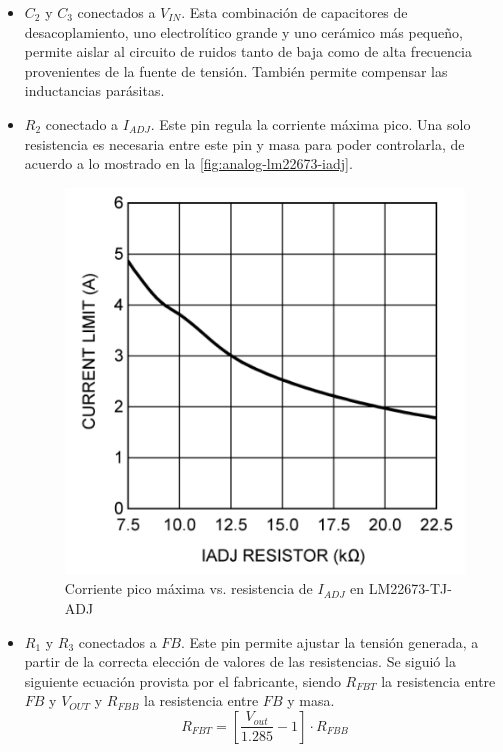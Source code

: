 \documentclass[titlepage, 12pt]{article}
\begin{document}
  \begin{itemize}

    \item $C_2$ y $C_3$ conectados a $V_{IN}$. Esta combinación de capacitores de desacoplamiento, uno electrolítico grande y uno cerámico más pequeño, permite aislar al circuito de ruidos tanto de baja como de alta frecuencia provenientes de la fuente de tensión. También permite compensar las inductancias parásitas.

    \item $R_2$ conectado a $I_{ADJ}$. Este pin regula la corriente máxima pico. Una solo resistencia es necesaria entre este pin y masa para poder controlarla, de acuerdo a lo mostrado en la \autoref{fig:analog-lm22673-iadj}.

      \begin{figure}[!htbp]
        \centering
        \includegraphics[scale=0.6]{images/analog-lm22673-iadj.png}
        \caption{Corriente pico máxima vs. resistencia de $I_{ADJ}$ en LM22673-TJ-ADJ}
        \label{fig:analog-lm22673-iadj}
      \end{figure}

    \item $R_1$ y $R_3$ conectados a $FB$. Este pin permite ajustar la tensión generada, a partir de la correcta elección de valores de las resistencias. Se siguió la siguiente ecuación provista por el fabricante, siendo $R_{FBT}$ la resistencia entre $FB$ y $V_{OUT}$ y $R_{FBB}$ la resistencia entre $FB$ y masa.
      \[
        R_{FBT} = \left[ \frac{V_{out}}{1.285} - 1 \right] \cdot R_{FBB}
      \]


\end{itemize}
\end{document}
